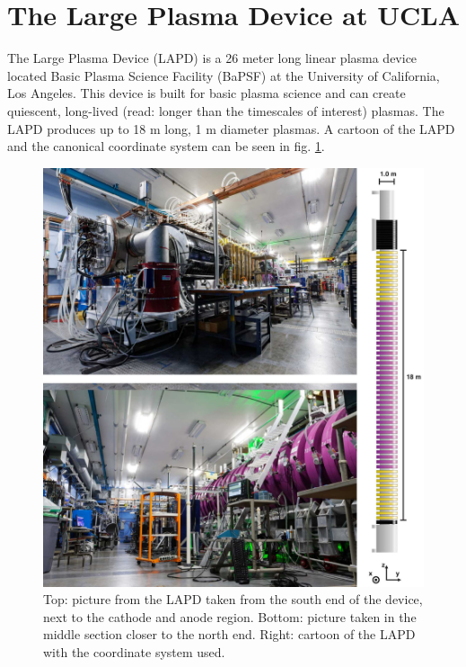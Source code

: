 \section{The Large Plasma Device at UCLA}

The Large Plasma Device (LAPD)\cite{gekelman_upgraded_2016,qian_design_2023} is a 26 meter long linear plasma device located Basic Plasma Science Facility (BaPSF) at the University of California, Los Angeles. This device is built for basic plasma science and can create quiescent, long-lived (read: longer than the timescales of interest) plasmas. The LAPD produces up to 18 m long, 1 m diameter plasmas. A cartoon of the LAPD and the canonical coordinate system can be seen in fig. \ref{fig:lapd-pics}.

\begin{figure}
	\centering
	\includegraphics[width=400pt]{figures/lapd_pics.jpg}
	\caption[Pictures of the LAPD]{\label{fig:lapd-pics}Top: picture from the LAPD taken from the south end of the device, next to the cathode and anode region. Bottom: picture taken in the middle section closer to the north end. Right: cartoon of the LAPD with the coordinate system used.}
\end{figure}

